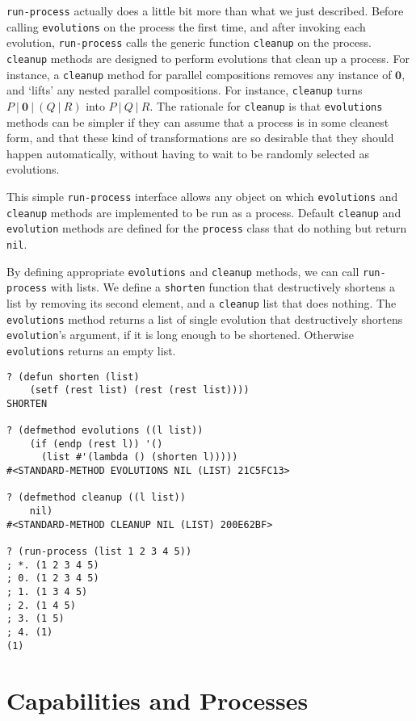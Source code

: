 \documentclass[12pt]{article}
\begin{document}
\texttt{run-process} actually does a little bit more than what we just described.
Before calling \texttt{evolutions} on the process the first time, and after invoking each evolution, \texttt{run-process} calls the generic function \texttt{cleanup} on the process.
\texttt{cleanup} methods are designed to perform evolutions that clean up a process.
For instance, a \texttt{cleanup} method for parallel compositions removes any instance of $\mathbf{0}$, and `lifts' any nested parallel compositions.
For instance, \texttt{cleanup} turns $P\ |\ \mathbf{0}\ |\ (Q\ |\ R)$ into $P\ |\ Q\ |\ R$.
The rationale for \texttt{cleanup} is that \texttt{evolutions} methods can be simpler if they can assume that a process is in some cleanest form, and that these kind of transformations are so desirable that they should happen automatically, without having to wait to be randomly selected as evolutions.

This simple \texttt{run-process} interface allows any object on which \texttt{evolutions} and \texttt{cleanup} methods are implemented to be run as a process.
Default \texttt{cleanup} and \texttt{evolution} methods are defined for the \texttt{process} class that do nothing but return \texttt{nil}.

By defining appropriate \texttt{evolutions} and \texttt{cleanup} methods, we can call \texttt{run-process} with lists.
We define a \texttt{shorten} function that destructively shortens a list by removing its second element, and a \texttt{cleanup} list that does nothing.
The \texttt{evolutions} method returns a list of single evolution that destructively shortens \texttt{evolution}'s argument, if it is long enough to be shortened.
Otherwise \texttt{evolutions} returns an empty list.

\begin{verbatim}
? (defun shorten (list)
    (setf (rest list) (rest (rest list))))
SHORTEN

? (defmethod evolutions ((l list))
    (if (endp (rest l)) '()
      (list #'(lambda () (shorten l)))))
#<STANDARD-METHOD EVOLUTIONS NIL (LIST) 21C5FC13>

? (defmethod cleanup ((l list))
    nil)
#<STANDARD-METHOD CLEANUP NIL (LIST) 200E62BF>

? (run-process (list 1 2 3 4 5))
; *. (1 2 3 4 5)
; 0. (1 2 3 4 5)
; 1. (1 3 4 5)
; 2. (1 4 5)
; 3. (1 5)
; 4. (1)
(1)
\end{verbatim}

\section{Capabilities and Processes}
\label{sec:capabilities-and-processes}
\end{document}
